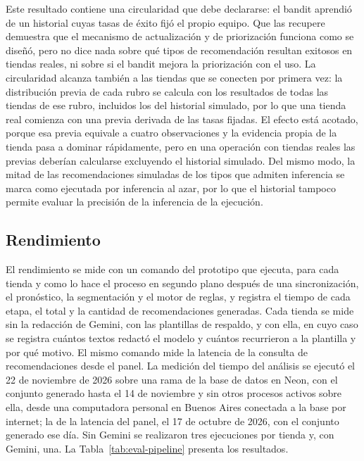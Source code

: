 Este resultado contiene una circularidad que debe declararse: el bandit aprendió de un historial cuyas tasas de éxito fijó el propio equipo. Que las recupere demuestra que el mecanismo de actualización y de priorización funciona como se diseñó, pero no dice nada sobre qué tipos de recomendación resultan exitosos en tiendas reales, ni sobre si el bandit mejora la priorización con el uso. La circularidad alcanza también a las tiendas que se conecten por primera vez: la distribución previa de cada rubro se calcula con los resultados de todas las tiendas de ese rubro, incluidos los del historial simulado, por lo que una tienda real comienza con una previa derivada de las tasas fijadas. El efecto está acotado, porque esa previa equivale a cuatro observaciones y la evidencia propia de la tienda pasa a dominar rápidamente, pero en una operación con tiendas reales las previas deberían calcularse excluyendo el historial simulado. Del mismo modo, la mitad de las recomendaciones simuladas de los tipos que admiten inferencia se marca como ejecutada por inferencia al azar, por lo que el historial tampoco permite evaluar la precisión de la inferencia de la ejecución.

\subsection{Rendimiento}
\label{sec:eval-rendimiento}

El rendimiento se mide con un comando del prototipo que ejecuta, para cada tienda y como lo hace el proceso en segundo plano después de una sincronización, el pronóstico, la segmentación y el motor de reglas, y registra el tiempo de cada etapa, el total y la cantidad de recomendaciones generadas. Cada tienda se mide sin la redacción de Gemini, con las plantillas de respaldo, y con ella, en cuyo caso se registra cuántos textos redactó el modelo y cuántos recurrieron a la plantilla y por qué motivo. El mismo comando mide la latencia de la consulta de recomendaciones desde el panel. La medición del tiempo del análisis se ejecutó el 22 de noviembre de 2026 sobre una rama de la base de datos en Neon, con el conjunto generado hasta el 14 de noviembre y sin otros procesos activos sobre ella, desde una computadora personal en Buenos Aires conectada a la base por internet; la de la latencia del panel, el 17 de octubre de 2026, con el conjunto generado ese día. Sin Gemini se realizaron tres ejecuciones por tienda y, con Gemini, una. La Tabla~\ref{tab:eval-pipeline} presenta los resultados.


